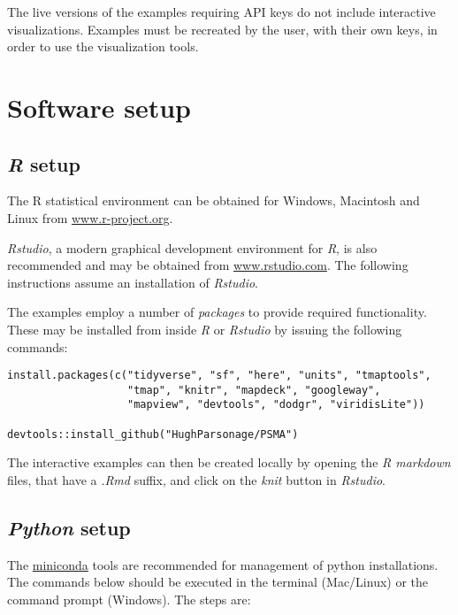 \documentclass[utf8]{frontiers_suppmat} %
\begin{document}
The live versions of the examples requiring API keys do not include interactive visualizations. Examples must be
recreated by the user, with their own keys, in order to use the visualization tools.

\section{Software setup}
\subsection{{\em R} setup}

The R statistical environment can be obtained for Windows, Macintosh
and Linux from
\href{http://cran.r-project.org/mirrors.html}{www.r-project.org}.

{\em Rstudio}, a modern graphical development environment for {\em R},
is also recommended and may be obtained from
\href{https://www.rstudio.com/products/rstudio/download/}{www.rstudio.com}. The
following instructions assume an installation of {\em Rstudio}.

The examples employ a number of {\em packages} to provide required
functionality. These may be installed from inside {\em R} or {\em
  Rstudio} by issuing the following commands:

\begin{verbatim}
install.packages(c("tidyverse", "sf", "here", "units", "tmaptools", 
                   "tmap", "knitr", "mapdeck", "googleway",
                   "mapview", "devtools", "dodgr", "viridisLite"))

devtools::install_github("HughParsonage/PSMA")
\end{verbatim}

The interactive examples can then be created locally by opening the
{\em R markdown} files, that have a {\em .Rmd} suffix, and click on
the {\em knit} button in {\em Rstudio}.

\subsection{{\em Python} setup}

The \href{https://docs.conda.io/en/latest/miniconda.html}{miniconda}
tools are recommended for management of python installations. The
commands below should be executed in the terminal (Mac/Linux) or the
command prompt (Windows). The steps are:
\end{document}
